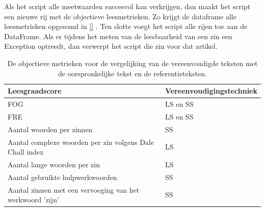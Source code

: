 Als het script alle meetwaarden succesvol kan verkrijgen, dan maakt het script een nieuwe rij met de objectieve leesmetrieken. Zo krijgt de dataframe alle leesmetrieken opgesomd in \ref{} . Ten slotte voegt het script alle rijen toe aan de DataFrame. Als er tijdens het meten van de leesbaarheid van een zin een Exception optreedt, dan verwerpt het script die zin voor dat artikel.

\begin{center}
	\begin{table}[H]
		\begin{tabular}{ | m{8cm} | m{7cm} | } 
			\hline
			\textbf{Leesgraadscore} & \textbf{Vereenvoudigingstechniek }\\
			\hline
			FOG & LS en SS \\
			\hline
			FRE & LS en SS \\
			\hline
			Aantal woorden per zinnen & SS \\
			\hline
			Aantal complexe woorden per zin volgens Dale Chall index & LS \\
			\hline
			Aantal lange woorden per zin & LS \\
			\hline
			Aantal gebruikte hulpwerkwoorden & SS \\
			\hline
			Aantal zinnen met een vervoeging van het werkwoord 'zijn' & SS \\
			\hline
		\end{tabular}
		\caption{De objectieve metrieken voor de vergelijking van de vereenvoudigde teksten met de oorspronkelijke tekst en de referentieteksten.}
		\label{table:verg-studie-metrieken}
	\end{table}
\end{center}

